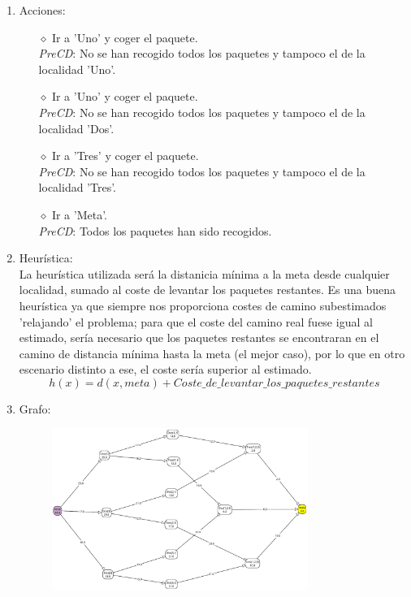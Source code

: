 \documentclass{article}
\begin{document}
\begin{enumerate}
    \item
        Acciones:
        \begin{itemize}
            \setlength\itemsep{1em}
            \item[$\diamond$] Ir a 'Uno' y coger el paquete. \\\textit{PreCD}: No se han recogido todos los paquetes y tampoco el de la localidad 'Uno'.
            \item[$\diamond$] Ir a 'Uno' y coger el paquete. \\\textit{PreCD}: No se han recogido todos los paquetes y tampoco el de la localidad 'Dos'.
            \item[$\diamond$] Ir a 'Tres' y coger el paquete. \\\textit{PreCD}: No se han recogido todos los paquetes y tampoco el de la localidad 'Tres'.
            \item[$\diamond$] Ir a 'Meta'. \\\textit{PreCD}: Todos los paquetes han sido recogidos.
        \end{itemize}
    
    \newpage
    \item
        Heurística: \bigskip\\
        La heurística utilizada será la distanicia mínima a la meta desde cualquier localidad, sumado al coste de levantar los paquetes restantes. 
        Es una buena heurística ya que siempre nos proporciona costes de camino subestimados 'relajando' el problema; para que el coste del camino real
        fuese igual al estimado, sería necesario que los paquetes restantes se encontraran en el camino de distancia mínima hasta la meta (el mejor caso), por
        lo que en otro escenario distinto a ese, el coste sería superior al estimado.
        \begin{equation}
            h(x)= d(x,meta) + Coste\_de\_levantar\_los\_paquetes\_restantes
        \end{equation}

    \item
        Grafo:
        \begin{figure}[h!]
            \centering
            \includegraphics[height=200px]{graph.png}
            \label{fig:diagram1}
        \end{figure}


\end{enumerate}
\end{document}
